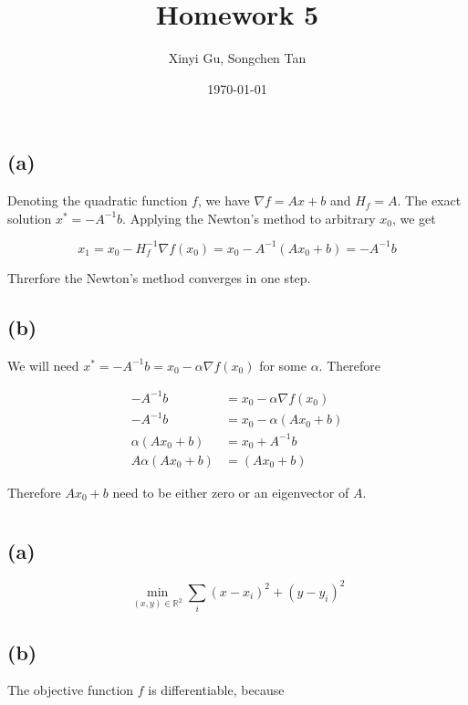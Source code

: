 \documentclass{article}
\title{Homework 5}
\author{Xinyi Gu, Songchen Tan}
\date{\today}
\begin{document}
\maketitle
\section{}
\subsection*{(a)}
Denoting the quadratic function $f$, we have $\nabla f=Ax+b$ and $H_f=A$. The exact solution $x^*=-A^{-1}b$. Applying the Newton's method to arbitrary $x_0$, we get

$$
x_1=x_0-H_f^{-1}\nabla f(x_0)=x_0-A^{-1}(Ax_0+b)=-A^{-1}b
$$

Threrfore the Newton's method converges in one step.

\subsection*{(b)}
We will need $x^*=-A^{-1}b=x_0-\alpha \nabla f(x_0)$ for some $\alpha$. Therefore

$$
\begin{aligned}
    -A^{-1}b&=x_0-\alpha \nabla f(x_0)\\
    -A^{-1}b&=x_0-\alpha (Ax_0+b)\\
    \alpha (Ax_0+b)&=x_0+A^{-1}b\\
    A\alpha (Ax_0+b)&=(Ax_0+b)
\end{aligned}
$$

Therefore $Ax_0+b$ need to be either zero or an eigenvector of $A$.

\section{}
\section{}
\subsection*{(a)}

$$
\min_{(x,y)\in\mathbb R^2}\sum_i(x-x_i)^2+(y-y_i)^2
$$
\subsection*{(b)}

The objective function $f$ is differentiable, because
\end{document}
